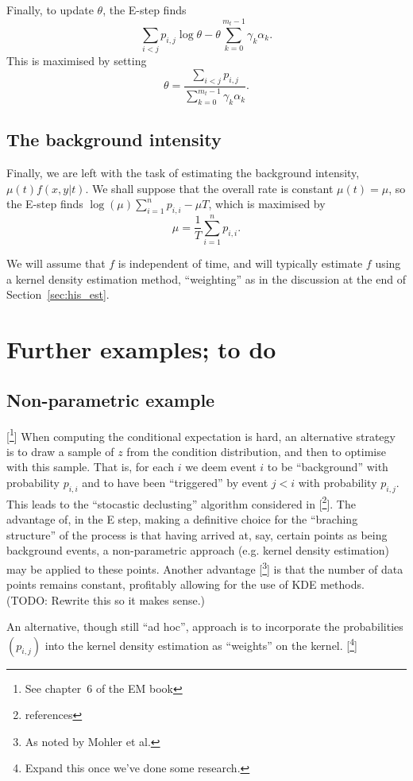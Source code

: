 \documentclass[twoside,a4paper]{article}
\theoremstyle{plain}
\theoremstyle{definition}
\begin{document}
Finally, to update $\theta$, the E-step finds
\[ \sum_{i<j} p_{i,j} \log\theta - \theta\sum_{k=0}^{m_t-1} \gamma_k \alpha_k. \]
This is maximised by setting
\[ \theta = \frac{\sum_{i<j} p_{i,j}}{\sum_{k=0}^{m_t-1} \gamma_k \alpha_k}. \]


\subsection{The background intensity}

Finally, we are left with the task of estimating the background intensity,
$\mu(t) f(x,y|t)$.  We shall suppose that the overall rate is constant $\mu(t)=\mu$,
so the E-step finds $\log(\mu) \sum_{i=1}^n p_{i,i} - \mu T$,
which is maximised by
\[ \mu = \frac{1}{T} \sum_{i=1}^n p_{i,i}. \]

We will assume that $f$ is independent of time, and will typically estimate $f$
using a kernel density estimation method, ``weighting'' as in the discussion
at the end of Section~\ref{sec:his_est}.




\section{Further examples; to do}

\subsection{Non-parametric example}

[\footnote{See chapter~6 of the EM book}]
When computing the conditional expectation is hard, an alternative strategy is to draw a sample
of $z$ from the condition distribution, and then to optimise with this sample.  That is, for
each $i$ we deem event $i$ to be ``background'' with probability $p_{i,i}$ and to have been
``triggered'' by event $j<i$ with probability $p_{i,j}$.  This leads to the ``stocastic declusting''
algorithm considered in [\footnote{references}].  The advantage of, in the E step, making
a definitive choice for the ``braching structure'' of the process is that having arrived at,
say, certain points as being background events, a non-parametric approach (e.g. kernel density
estimation) may be applied to these points.  Another advantage [\footnote{As noted by Mohler et al.}]
is that the number of data points remains constant, profitably allowing for the use of KDE methods.
(TODO: Rewrite this so it makes sense.)

An alternative, though still ``ad hoc'', approach is to incorporate the probabilities $(p_{i,j})$
into the kernel density estimation as ``weights'' on the kernel.  [\footnote{Expand this once we've
done some research.}]
\end{document}
